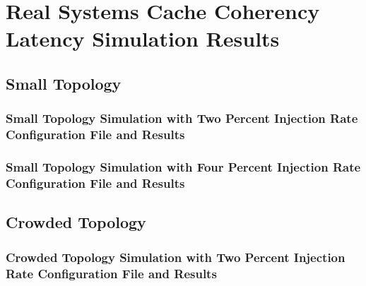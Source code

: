 \chapter{Real Systems Cache Coherency Latency Simulation Results}
\section{Small Topology}
\subsection{Small Topology Simulation with Two Percent Injection Rate Configuration File and Results}

\subsection{Small Topology Simulation with Four Percent Injection Rate Configuration File and Results}


\section{Crowded Topology}
\subsection{Crowded Topology Simulation with Two Percent Injection Rate  Configuration File and Results}

